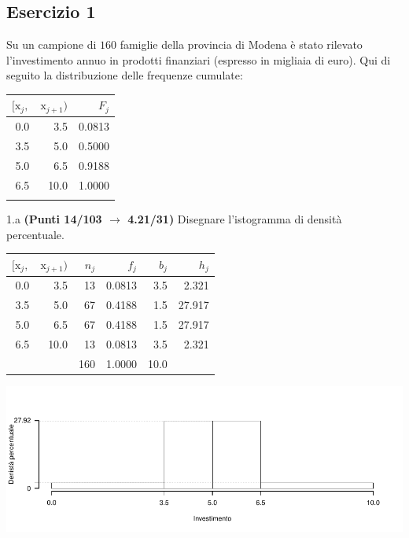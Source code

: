 \documentclass[
  11pt,
]{book}
\theoremstyle{mytheoremstyle}
\theoremstyle{mydefstyle}
\newenvironment{sol}
  {
  \begin{tcolorbox}[enhanced,breakable,arc=0.1mm,boxrule=1pt,colback=white,colframe=iblue,
  title=\bf \fontfamily{lmss}\selectfont \hspace{.5 cm} Soluzione,drop fuzzy shadow]

}{
\end{tcolorbox}
  }
\begin{document}
\subsection{Esercizio 1}\label{esercizio-1-21}

Su un campione di \(160\) famiglie della provincia di Modena è stato rilevato l'investimento annuo in prodotti finanziari (espresso in migliaia di euro). Qui di seguito la distribuzione delle frequenze cumulate:

\begin{table}[H]
\centering
\begin{tabular}{rrr}
\toprule
$[\text{x}_j,$ & $\text{x}_{j+1})$ & $F_j$\\
\midrule
0.0 & 3.5 & 0.0813\\
3.5 & 5.0 & 0.5000\\
5.0 & 6.5 & 0.9188\\
6.5 & 10.0 & 1.0000\\
 &  & \\
\bottomrule
\end{tabular}
\end{table}

1.a \textbf{(Punti 14/103 \(\rightarrow\) 4.21/31)} Disegnare l'istogramma di densità percentuale.

\begin{sol}

\begin{table}[H]
\centering
\begin{tabular}{rrrrrr}
\toprule
$[\text{x}_j,$ & $\text{x}_{j+1})$ & $n_j$ & $f_j$ & $b_j$ & $h_j$\\
\midrule
0.0 & 3.5 & 13 & 0.0813 & 3.5 & 2.321\\
3.5 & 5.0 & 67 & 0.4188 & 1.5 & 27.917\\
5.0 & 6.5 & 67 & 0.4188 & 1.5 & 27.917\\
6.5 & 10.0 & 13 & 0.0813 & 3.5 & 2.321\\
 &  & 160 & 1.0000 & 10.0 & \\
\bottomrule
\end{tabular}
\end{table}

\begin{center}\includegraphics{Esami_passati_con_soluzioni_files/figure-latex/2023-127-1} \end{center}

\end{sol}
\end{document}
